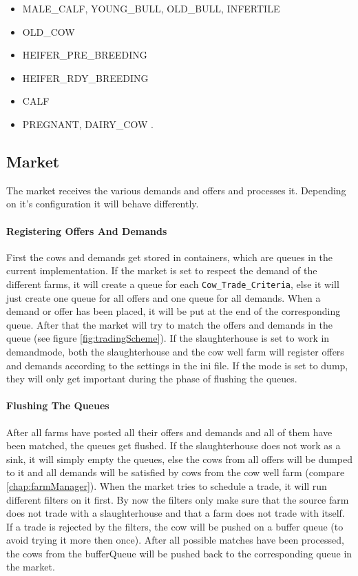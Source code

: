 \begin{itemize}
\item MALE\_CALF, YOUNG\_BULL, OLD\_BULL, INFERTILE
\item OLD\_COW
\item HEIFER\_PRE\_BREEDING  
\item HEIFER\_RDY\_BREEDING
\item CALF
\item PREGNANT, DAIRY\_COW .
\end{itemize}

\subsection{Market}\label{chap:market}
The market receives the various demands and offers and processes it. Depending on it's configuration it will behave differently.
\paragraph{Registering Offers And Demands}
First the cows and demands get stored in containers, which are queues in the current implementation. If the market is set to respect the demand of the different farms, it will create a queue for each {\tt Cow\_Trade\_Criteria}, else it will just create one queue for all offers and one queue for all demands. When a demand or offer has been placed, it will be put at the end of the corresponding queue. After that the market will try to match the offers and demands in the queue (see figure \ref{fig:tradingScheme}). If the slaughterhouse is set to work in \glqq demand\grqq mode, both the slaughterhouse and the cow well farm will register offers and demands according to the settings in the ini file. If the mode is set to \glqq dump\grqq, they will only get important during the phase of flushing the queues.

\paragraph{Flushing The Queues}
After all farms have posted all their offers and demands and all of them have been matched, the queues get flushed. If the slaughterhouse does not work as a sink, it will simply empty the queues, else the cows from all offers will be dumped to it and all demands will be satisfied by cows from the cow well farm (compare \ref{chap:farmManager}). When the market tries to schedule a trade, it will run different filters on it first. By now the filters only make sure that the source farm does not trade with a slaughterhouse and that a farm does not trade with itself. If a trade is rejected by the filters, the cow will be pushed on a buffer queue (to avoid trying it more then once). After all possible matches have been processed, the cows from the bufferQueue will be pushed back to the corresponding queue in the market.

